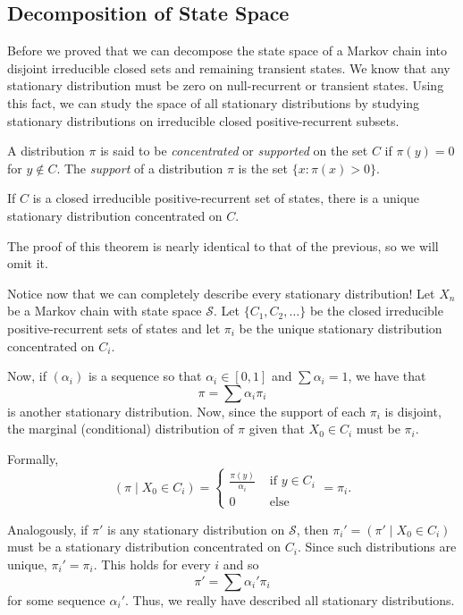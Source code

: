 \documentclass{problemset}
\newcommand{\1}{\mathbf{1}}
\begin{document}
	\subsection*{Decomposition of State Space}

	Before we proved that we can decompose the state space of a Markov chain into
	disjoint irreducible closed sets and remaining transient states.  We know
	that any stationary distribution must be zero on null-recurrent or transient states.
	Using this fact, we can study the space of all stationary distributions by studying
	stationary distributions on irreducible closed positive-recurrent subsets.

	\begin{definition}
		A distribution $\pi$ is said to be \emph{concentrated} or \emph{supported} on the
		set $C$ if $\pi(y)=0$ for $y\notin C$.  The \emph{support} of a distribution
		$\pi$ is the set $\{x:\pi(x)>0\}$.
	\end{definition}

	\begin{theorem}
		If $C$ is a closed irreducible positive-recurrent set of states, there is a unique
		stationary distribution concentrated on $C$.
	\end{theorem}

	The proof of this theorem is nearly identical to that of the previous, so we will omit it.

	Notice now that we can completely describe every stationary distribution!  Let $X_n$ be a Markov
	chain with state space $\mathcal S$.  Let $\{C_1,C_2,\ldots\}$ be the closed irreducible
	positive-recurrent sets of states and let $\pi_i$ be the unique stationary distribution
	concentrated on $C_i$.  

	Now, if $(\alpha_i)$ is a sequence so that $\alpha_i\in[0,1]$ and $\sum \alpha_i=1$, we have that
	\[
		\pi = \sum \alpha_i\pi_i
	\]
	is another stationary distribution.  Now, since the support of each $\pi_i$ is disjoint,
	the marginal (conditional) distribution of $\pi$ given that $X_0\in C_i$ must be $\pi_i$.

	Formally, 
	\[
	(\pi\mid X_0\in C_i)= \begin{cases}\frac{\pi(y)}{\alpha_i}&\text{ if }y\in C_i\\0&\text{ else}\end{cases}
		=\pi_i.
	\]

	Analogously, if $\pi'$ is any stationary distribution on $\mathcal S$, then $\pi_i'=(\pi'\mid X_0\in C_i)$
	must be a stationary distribution concentrated on $C_i$.  Since such distributions are unique, $\pi_i'=\pi_i$.
	This holds for every $i$ and so
	\[
		\pi' = \sum \alpha_i'\pi_i
	\]
	for some sequence $\alpha_i'$.  Thus, we really have described all stationary distributions.
\end{document}
